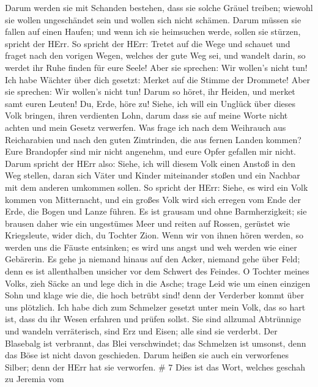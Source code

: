  Darum werden sie mit Schanden bestehen, dass sie solche
Gräuel treiben; wiewohl sie wollen ungeschändet sein und wollen sich
nicht schämen. Darum müssen sie fallen auf einen Haufen; und wenn ich
sie heimsuchen werde, sollen sie stürzen, spricht der HErr.
 So spricht der HErr: Tretet auf die Wege und schauet und
fraget nach den vorigen Wegen, welches der gute Weg sei, und wandelt
darin, so werdet ihr Ruhe finden für eure Seele! Aber sie sprechen: Wir
wollen's nicht tun!  Ich habe Wächter über dich gesetzt:
Merket auf die Stimme der Drommete! Aber sie sprechen: Wir wollen's
nicht tun!  Darum so höret, ihr Heiden, und merket samt
euren Leuten!  Du, Erde, höre zu! Siehe, ich will ein
Unglück über dieses Volk bringen, ihren verdienten Lohn, darum dass sie
auf meine Worte nicht achten und mein Gesetz verwerfen. 
Was frage ich nach dem Weihrauch aus Reicharabien und nach den guten
Zimtrinden, die aus fernen Landen kommen? Eure Brandopfer sind mir nicht
angenehm, und eure Opfer gefallen mir nicht.  Darum spricht
der HErr also: Siehe, ich will diesem Volk einen Anstoß in den Weg
stellen, daran sich Väter und Kinder miteinander stoßen und ein Nachbar
mit dem anderen umkommen sollen.  So spricht der HErr:
Siehe, es wird ein Volk kommen von Mitternacht, und ein großes Volk wird
sich erregen vom Ende der Erde,  die Bogen und Lanze
führen. Es ist grausam und ohne Barmherzigkeit; sie brausen daher wie
ein ungestümes Meer und reiten auf Rossen, gerüstet wie Kriegsleute,
wider dich, du Tochter Zion.  Wenn wir von ihnen hören
werden, so werden uns die Fäuste entsinken; es wird uns angst und weh
werden wie einer Gebärerin.  Es gehe ja niemand hinaus auf
den Acker, niemand gehe über Feld; denn es ist allenthalben unsicher vor
dem Schwert des Feindes.  O Tochter meines Volks, zieh
Säcke an und lege dich in die Asche; trage Leid wie um einen einzigen
Sohn und klage wie die, die hoch betrübt sind! denn der Verderber kommt
über uns plötzlich.  Ich habe dich zum Schmelzer gesetzt
unter mein Volk, das so hart ist, dass du ihr Wesen erfahren und prüfen
sollst.  Sie sind allzumal Abtrünnige und wandeln
verräterisch, sind Erz und Eisen; alle sind sie verderbt. 
Der Blasebalg ist verbrannt, das Blei verschwindet; das Schmelzen ist
umsonst, denn das Böse ist nicht davon geschieden.  Darum
heißen sie auch ein verworfenes Silber; denn der HErr hat sie verworfen.
\# 7  Dies ist das Wort, welches geschah zu Jeremia vom

